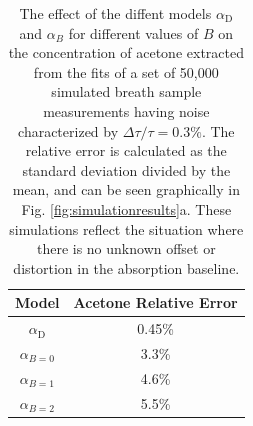\documentclass[12pt]{report}
\begin{document}
	\begin{table}[H]
		\caption{The effect of the diffent models $\alpha_\mathrm{D}$ and $\alpha_B$ for different values of $B$ on the concentration of acetone extracted from the fits of a set of 50,000 simulated breath sample measurements having noise characterized by $\Delta \tau/\tau = 0.3\%$. The relative error is calculated as the standard deviation divided by the mean, and can be seen graphically in Fig. \ref{fig:simulationresults}a. These simulations reflect the situation where there is no unknown offset or distortion in the absorption baseline.}
		\begin{center}
			\begin{tabular}{|c|c|}
				\hline
				\textbf{Model} & \textbf{Acetone Relative Error} \\
				\hline
				$\alpha_\mathrm{D}$ & 0.45\% \\
				\hline
				$\alpha_{B=0}$ & 3.3\% \\
				\hline
				$\alpha_{B=1}$ & 4.6\% \\
				\hline
				$\alpha_{B=2}$ & 5.5\% \\
				\hline
			\end{tabular}
		\end{center}
		\label{tbl:simulation_errs_acetone}
	\end{table}
	
\end{document}
